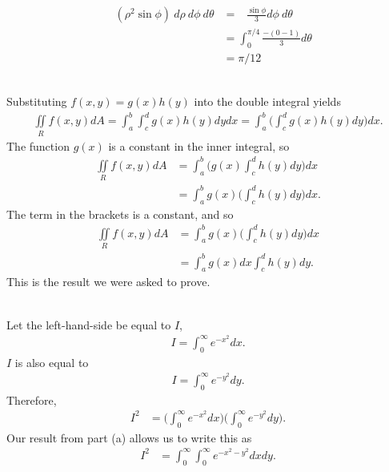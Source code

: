 \begin{align*}
  \mathop{\int_0^{\pi/4} \!\! \int_{0}^{\pi/2} \!\! \int_0^1 } ( \rho^2 \sin\phi ) \ d\rho\  d\phi\  d\theta
  &=   \mathop{\int_0^{\pi/4} \!\! \int_{0}^{\pi/2} }  \frac{ \sin\phi}{3}  d\phi\  d\theta\\
  &=   \int_0^{\pi/4} \frac{-(0-1)}{3}   d\theta \\
  &=  \pi/12
\end{align*}
\item %
 \\
Substituting $f(x,y) = g(x)h(y)$ into the double integral yields
\begin{align*}
   \iint\limits_{R} f(x,y) dA 
   =  \int_a^b  \int_c^d g(x) h(y) dydx 
   =  \int_a^b \Bigg( \int_c^d g(x) h(y) dy \Bigg) dx .
\end{align*}
The function $g(x)$ is a constant in the inner integral, so
\begin{align*}
   \iint\limits_{R} f(x,y) dA 
   &=  \int_a^b  \Bigg( g(x)\int_c^d h(y) dy \Bigg) dx \\
   &=  \int_a^b   g(x) \Bigg(\int_c^d h(y) dy \Bigg) dx .
\end{align*}
The term in the brackets is a constant, and so 
\begin{align*}
   \iint\limits_{R} f(x,y) dA 
   &=  \int_a^b   g(x) \Bigg(\int_c^d h(y) dy \Bigg) dx \\
   &=  \int_a^b   g(x) dx \int_c^d h(y) dy.
\end{align*}
This is the result we were asked to prove.
\item %
 \\
 Let the left-hand-side be equal to $I$,
\begin{align*}
   I=\int_{0}^{\infty} e^{-x^2} dx.
\end{align*}
$I$ is also equal to
\begin{align*}
   I=\int_{0}^{\infty} e^{-y^2} dy.
\end{align*}
Therefore,
\begin{align*}
  I^2 &= \Bigg(\int_{0}^{\infty} e^{-x^2} dx\Bigg)\Bigg(\int_{0}^{\infty} e^{-y^2} dy\Bigg).
\end{align*}
Our result from part (a) allows us to write this as
\begin{align*}
  I^2 &= \int_{0}^{\infty} \int_{0}^{\infty} e^{-x^2-y^2} dxdy.
\end{align*}
